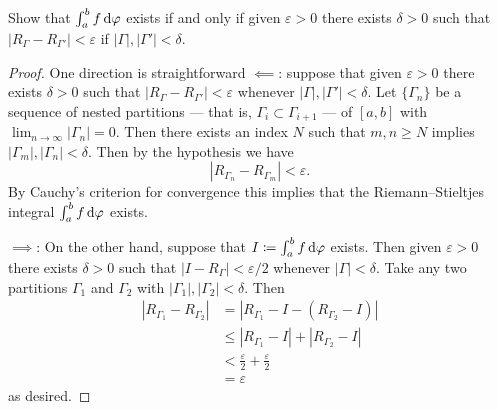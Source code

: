 \begin{problem}
  Show that $\int_a^bf\mathop{}\!\mathrm{d}\varphi$ exists if and only if given
  $\varepsilon>0$ there exists $\delta>0$ such that
  $\left|R_\Gamma-R_{\Gamma'}\right|<\varepsilon$ if
  $|\Gamma|,|\Gamma'|<\delta$.
\end{problem}
\begin{proof}
  One direction is straightforward $\impliedby$: suppose that given
  $\varepsilon>0$ there exists $\delta>0$ such that
  $|R_\Gamma-R_{\Gamma'}|<\varepsilon$ whenever
  $|\Gamma|,|\Gamma'|<\delta$. Let $\{\Gamma_n\}$ be a sequence of nested
  partitions --- that is, $\Gamma_i\subset\Gamma_{i+1}$ --- of $[a,b]$ with
  $\lim_{n\to\infty}|\Gamma_n|=0$. Then there exists an index $N$ such that
  $m,n\geq N$ implies $|\Gamma_m|,|\Gamma_n|<\delta$. Then by the
  hypothesis we have
  \[
    \left|R_{\Gamma_n}-R_{\Gamma_m}\right|<\varepsilon.
  \]
  By Cauchy's criterion for convergence this implies that the
  Riemann--Stieltjes integral $\int_a^b f\mathop{}\!\mathrm{d}\varphi$ exists.

  $\implies$: On the other hand, suppose that
  $I\coloneq\int_a^b f\mathop{}\!\mathrm{d}\varphi$ exists. Then given $\varepsilon>0$
  there exists $\delta>0$ such that $|I-R_\Gamma|<\varepsilon/2$ whenever
  $|\Gamma|<\delta$. Take any two partitions $\Gamma_1$ and $\Gamma_2$ with
  $|\Gamma_1|,|\Gamma_2|<\delta$. Then
  \begin{align*}
    |R_{\Gamma_1}-R_{\Gamma_2}|
    &=\left|R_{\Gamma_1}-I-(R_{\Gamma_2}-I)\right|\\
    &\leq|R_{\Gamma_1}-I|+|R_{\Gamma_2}-I|\\
    &<\frac{\varepsilon}{2}+\frac{\varepsilon}{2}\\
    &=\varepsilon
  \end{align*}
  as desired.
\end{proof}


